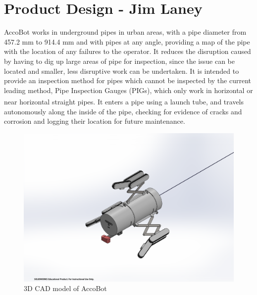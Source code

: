 \documentclass[11pt]{article}		%
\newlength{\imageheight}	 %
\newcommand{\supercite}[1]{\textsuperscript{\cite{#1}}}		%
\begin{document}
		
	\section[Product Design - ENG]{Product Design - Jim Laney}

		AccoBot works in underground pipes in urban areas, with a pipe diameter from 457.2 mm to 914.4 mm and with pipes at any angle, providing a map of the pipe with the location of any failures to the operator. %
		It reduces the disruption caused by having to dig up large areas of pipe for inspection, since the issue can be located and smaller, less disruptive work can be undertaken.
		It is intended to provide an inspection method for pipes which cannot be inspected by the current leading method, Pipe Inspection Gauges (PIGs), which only work in horizontal or near horizontal straight pipes\supercite{mills2017advances}.
		It enters a pipe using a launch tube, and travels autonomously along the inside of the pipe, checking for evidence of cracks and corrosion and logging their location for future maintenance.
		\\
		
		\begin{figure}[h] %
			\centering
			\includegraphics[trim={6cm 2cm 7cm 4cm},clip,height=\imageheight]{overviewCAD}
			\caption{3D CAD model of AccoBot}
			\label{3DSketch}
		\end{figure}
		
\end{document}
